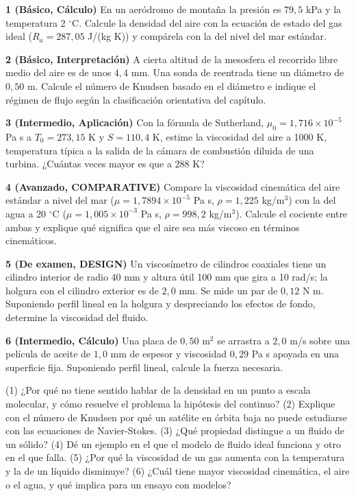 \documentclass[10pt,openany]{book}
\begin{document}
\begin{tcolorbox}[title={Ejercicios propuestos}, studiumworked, breakable]

\noindent\textbf{1 (Básico, Cálculo)}
En un aeródromo de montaña la presión es \(79{,}5\) kPa y la temperatura 2 \(^\circ\)C. Calcule la densidad del aire con la ecuación de estado del gas ideal (\(R_a = 287{,}05\) J/(kg K)) y compárela con la del nivel del mar estándar.

\noindent\textbf{2 (Básico, Interpretación)}
A cierta altitud de la mesosfera el recorrido libre medio del aire es de unos \(4{,}4\) mm. Una sonda de reentrada tiene un diámetro de \(0{,}50\) m. Calcule el número de Knudsen basado en el diámetro e indique el régimen de flujo según la clasificación orientativa del capítulo.

\noindent\textbf{3 (Intermedio, Aplicación)}
Con la fórmula de Sutherland, \(\mu_0 = 1{,}716\times 10^{-5}\) Pa s a \(T_0 = 273{,}15\) K y \(S = 110{,}4\) K, estime la viscosidad del aire a 1000 K, temperatura típica a la salida de la cámara de combustión diluida de una turbina. ¿Cuántas veces mayor es que a 288 K?

\noindent\textbf{4 (Avanzado, COMPARATIVE)}
Compare la viscosidad cinemática del aire estándar a nivel del mar (\(\mu = 1{,}7894\times 10^{-5}\) Pa s, \(\rho = 1{,}225\) kg/m\(^3\)) con la del agua a 20 \(^\circ\)C (\(\mu = 1{,}005\times 10^{-3}\) Pa s, \(\rho = 998{,}2\) kg/m\(^3\)). Calcule el cociente entre ambas y explique qué significa que el aire sea más viscoso en términos cinemáticos.

\noindent\textbf{5 (De examen, DESIGN)}
Un viscosímetro de cilindros coaxiales tiene un cilindro interior de radio 40 mm y altura útil 100 mm que gira a 10 rad/s; la holgura con el cilindro exterior es de \(2{,}0\) mm. Se mide un par de \(0{,}12\) N m. Suponiendo perfil lineal en la holgura y despreciando los efectos de fondo, determine la viscosidad del fluido.

\noindent\textbf{6 (Intermedio, Cálculo)}
Una placa de \(0{,}50\) m\(^2\) se arrastra a \(2{,}0\) m/s sobre una película de aceite de \(1{,}0\) mm de espesor y viscosidad \(0{,}29\) Pa s apoyada en una superficie fija. Suponiendo perfil lineal, calcule la fuerza necesaria.
\end{tcolorbox}

\begin{tcolorbox}[title={Autoevaluación}, studiumcheck, breakable]

(1) ¿Por qué no tiene sentido hablar de la densidad en un punto a escala molecular, y cómo resuelve el problema la hipótesis del continuo? (2) Explique con el número de Knudsen por qué un satélite en órbita baja no puede estudiarse con las ecuaciones de Navier-Stokes. (3) ¿Qué propiedad distingue a un fluido de un sólido? (4) Dé un ejemplo en el que el modelo de fluido ideal funciona y otro en el que falla. (5) ¿Por qué la viscosidad de un gas aumenta con la temperatura y la de un líquido disminuye? (6) ¿Cuál tiene mayor viscosidad cinemática, el aire o el agua, y qué implica para un ensayo con modelos?
\end{tcolorbox}
\studiumchaptercheck
\end{document}

